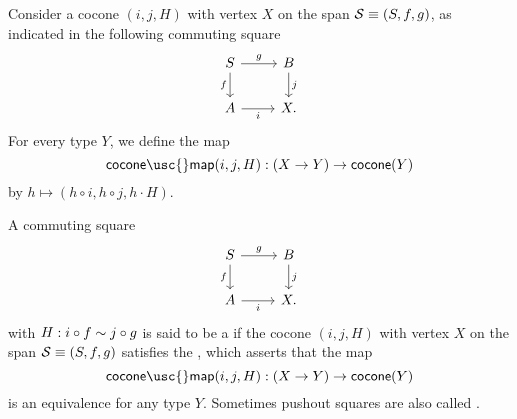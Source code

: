 \begin{defn}
Consider a cocone $(i,j,H)$ with vertex $X$ on the span $\mathcal{S}\equiv (S,f,g)$, as indicated in the following commuting square
\begin{equation*}
\begin{tikzcd}
S \arrow[r,"g"] \arrow[d,swap,"f"] & B \arrow[d,"j"] \\
A \arrow[r,swap,"i"] & X.
\end{tikzcd}
\end{equation*}
For every type $Y$, we define the map
\begin{equation*}
\mathsf{cocone\usc{}map}(i,j,H):(X\to Y)\to \mathsf{cocone}(Y)
\end{equation*}
by $h\mapsto (h\circ i,h\circ j,h\cdot H)$.
\end{defn}

\begin{defn}
  A commuting square
  \begin{equation*}
    \begin{tikzcd}
      S \arrow[r,"g"] \arrow[d,swap,"f"] & B \arrow[d,"j"] \\
      A \arrow[r,swap,"i"] & X.
    \end{tikzcd}
  \end{equation*}
  with $H:i\circ f \sim j\circ g$ is said to be a  if the cocone $(i,j,H)$ with vertex $X$ on the span $\mathcal{S}\equiv (S,f,g)$
  satisfies the , which asserts that the map
  \begin{equation*}
    \mathsf{cocone\usc{}map}(i,j,H):(X\to Y)\to \mathsf{cocone}(Y)
  \end{equation*}
  is an equivalence for any type $Y$. Sometimes pushout squares are also called .
\end{defn}

